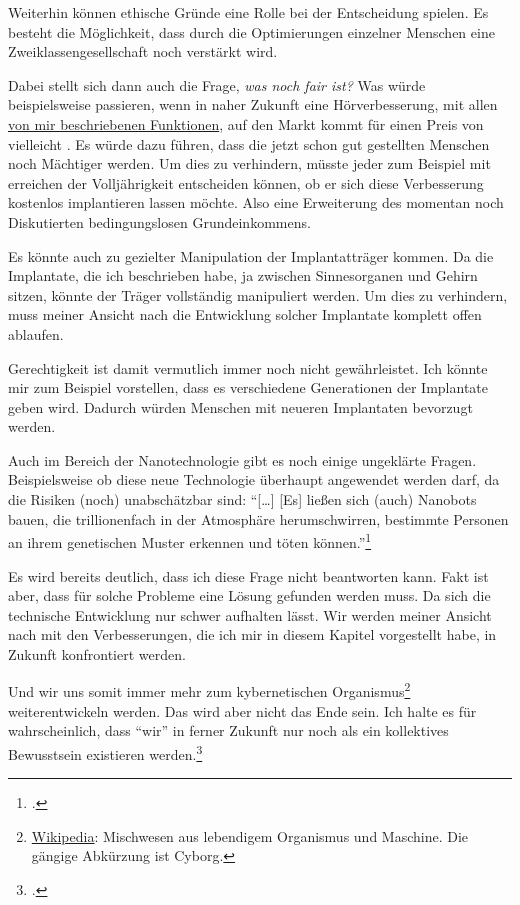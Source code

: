 Weiterhin können ethische Gründe eine Rolle bei der Entscheidung spielen. Es besteht die
Möglichkeit, dass durch die Optimierungen einzelner Menschen eine Zweiklassengesellschaft noch
verstärkt wird.

Dabei stellt sich dann auch die Frage, \emph{was noch fair ist?} Was würde beispielsweise passieren,
wenn in
naher Zukunft eine Hörverbesserung, mit allen \hyperref[sec:Robin:future:hearing]{von mir
beschriebenen Funktionen}, auf den Markt kommt für einen Preis von vielleicht . Es würde
dazu führen, dass die jetzt schon gut gestellten Menschen noch Mächtiger werden. Um dies zu
verhindern, müsste jeder zum Beispiel mit erreichen der Volljährigkeit entscheiden können, ob er sich
diese Verbesserung kostenlos implantieren lassen möchte. Also eine Erweiterung des momentan noch
Diskutierten bedingungslosen Grundeinkommens.

\begin{comment}
Eine weitere Frage ist, bis wann wir noch als Menschen zählen?
„Ist man noch ein Mensch, wenn man den Teil im Gehirn abgeschaltet hat, der für Schuldgefühle
zuständig ist?“\footcite{23C3:body_hacking}
\end{comment}

Es könnte auch zu gezielter Manipulation der Implantatträger kommen. Da die Implantate, die ich
beschrieben habe, ja zwischen Sinnesorganen und Gehirn sitzen, könnte der Träger vollständig
manipuliert werden. Um dies zu verhindern, muss meiner Ansicht nach die Entwicklung solcher
Implantate komplett offen ablaufen.

Gerechtigkeit ist damit vermutlich immer noch nicht gewährleistet. Ich könnte mir zum Beispiel
vorstellen, dass es verschiedene Generationen der Implantate geben wird. Dadurch würden Menschen mit
neueren Implantaten bevorzugt werden.

Auch im Bereich der Nanotechnologie gibt es noch einige ungeklärte Fragen. Beispielsweise ob diese
neue Technologie überhaupt angewendet werden darf, da die Risiken (noch) unabschätzbar sind:
\enquote{[\dots] [Es] ließen sich (auch) Nanobots bauen, die trillionenfach in der Atmosphäre
herumschwirren, bestimmte Personen an ihrem genetischen Muster erkennen und töten
können.}\footcite[13]{Heise:Telepolis:Mensch:Unsterblichkeit}

Es wird bereits deutlich, dass ich diese Frage nicht beantworten kann. Fakt ist aber, dass für solche
Probleme eine Lösung gefunden werden muss. Da sich die technische Entwicklung nur schwer aufhalten
lässt. Wir werden meiner Ansicht nach mit den Verbesserungen, die ich mir in diesem Kapitel
vorgestellt habe, in Zukunft konfrontiert werden.

Und wir uns somit immer mehr zum kybernetischen
Organismus\footnote{\href{http://de.wikipedia.org/wiki/Cyborg}{Wikipedia}: Mischwesen aus lebendigem
Organismus und Maschine. Die gängige Abkürzung ist Cyborg.} weiterentwickeln werden.
Das wird aber nicht das Ende sein. Ich halte es für wahrscheinlich, dass \enquote{wir} in ferner
Zukunft nur noch als ein kollektives Bewusstsein
existieren werden.\footcite{Heise:Telepolis:Mensch:globales_Gehirn}
